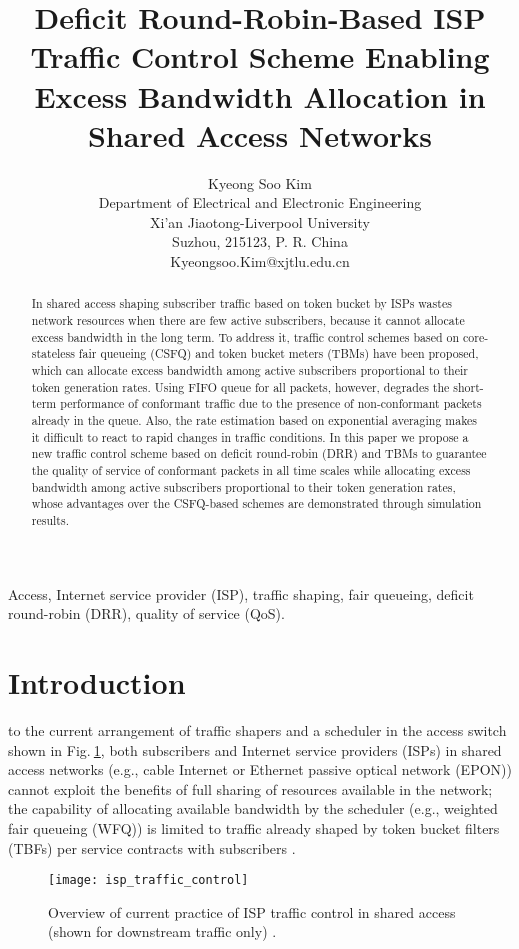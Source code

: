 \documentclass[conference,twoside,final]{IEEEtran}
\title{\LARGE Deficit Round-Robin-Based ISP Traffic Control Scheme Enabling
  Excess Bandwidth Allocation in Shared Access Networks}
\author{Kyeong Soo Kim\\Department of Electrical and Electronic
  Engineering\\Xi'an Jiaotong-Liverpool University\\Suzhou, 215123,
  P. R. China\\Kyeongsoo.Kim@xjtlu.edu.cn}
\begin{document}
\maketitle


\begin{abstract}
  In shared access shaping subscriber traffic based on token bucket by ISPs
  wastes network resources when there are few active subscribers, because it
  cannot allocate excess bandwidth in the long term. To address it, traffic
  control schemes based on core-stateless fair queueing (CSFQ) and token bucket
  meters (TBMs) have been proposed, which can allocate excess bandwidth among
  active subscribers proportional to their token generation rates. Using FIFO
  queue for all packets, however, degrades the short-term performance of
  conformant traffic due to the presence of non-conformant packets already in
  the queue. Also, the rate estimation based on exponential averaging makes it
  difficult to react to rapid changes in traffic conditions. In this paper we
  propose a new traffic control scheme based on deficit round-robin (DRR) and
  TBMs to guarantee the quality of service of conformant packets in all time
  scales while allocating excess bandwidth among active subscribers proportional
  to their token generation rates, whose advantages over the CSFQ-based schemes
  are demonstrated through simulation results.
\end{abstract}

\begin{IEEEkeywords}
  Access, Internet service provider (ISP), traffic shaping, fair queueing,
  deficit round-robin (DRR), quality of service (QoS).
\end{IEEEkeywords}


\section{Introduction}
\label{sec-1}
 to the current arrangement of traffic shapers and a
scheduler in the access switch shown in Fig.\(~\)\ref{fg:isp_traffic_control},
both subscribers and Internet service providers (ISPs) in shared access networks
(e.g., cable Internet or Ethernet passive optical network (EPON)) cannot exploit
the benefits of full sharing of resources available in the network; the
capability of allocating available bandwidth by the scheduler (e.g., weighted
fair queueing (WFQ)) is limited to traffic already shaped by token bucket
filters (TBFs) per service contracts with subscribers \cite{Kim:14-5}.
\begin{figure}[!htb]
    \begin{center}
      \texttt{[image: isp\_traffic\_control]}
    \end{center}
\caption{Overview of current practice of ISP traffic control in shared access (shown for downstream traffic only) \cite{Kim:14-5}.}
  \label{fg:isp_traffic_control}
\end{figure}
\end{document}
